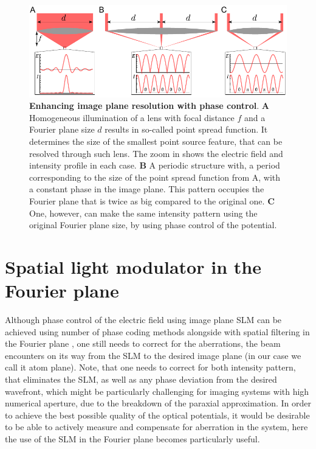 \begin{figure}[t]
	\centering
	\includegraphics[scale=1]{figures/DMD_lens.pdf}
	\caption{{\bf Enhancing image plane resolution with phase control}. {\bf A} Homogeneous illumination of a lens with focal distance $f$ and a Fourier plane size $d$ results in so-called point spread function. It determines the size of the smallest point source feature, that can be resolved through such lens. The zoom in shows the electric field and intensity profile in each case. {\bf B} A periodic structure with, a period corresponding to the size of the point spread function from A, with a constant phase in the image plane. This pattern occupies the Fourier plane that is twice as big compared to the original one. {\bf C} One, however, can make the same intensity pattern using the original Fourier plane size, by using phase control of the potential.}
	\label{fig:DMD_lens}
\end{figure}



\section{Spatial light modulator in the Fourier plane}
Although phase control of the electric field using image plane SLM can be achieved using number of phase coding methods alongside with spatial filtering in the Fourier plane \cite{Lee1970, Goorden2014}, one still needs to correct for the aberrations, the beam encounters on its way from the SLM to the desired image plane (in our case we call it atom plane). Note, that one needs to correct for both intensity pattern, that eliminates the SLM, as well as any phase deviation from the desired wavefront, which might be particularly challenging for imaging systems with high numerical aperture, due to the breakdown of the paraxial approximation. In order to achieve the best possible quality of the optical potentials, it would be desirable to be able to actively measure and compensate for aberration in the system, here the use of the SLM in the Fourier plane becomes particularly useful.

